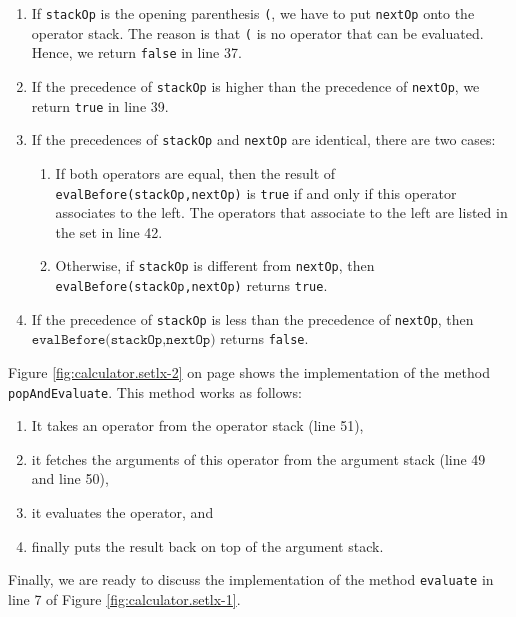 \begin{enumerate}
\item If \texttt{stackOp} is the opening parenthesis \texttt{(}, we have to put
      \texttt{nextOp} onto the operator stack.  The reason is that \texttt{(}
      is no operator that can be evaluated.  Hence, we return \texttt{false} in line 37.
\item If the precedence of \texttt{stackOp} is higher than the precedence of \texttt{nextOp}, we
      return \texttt{true} in line 39.
\item If the precedences of \texttt{stackOp} and \texttt{nextOp} are identical, there are two cases:
      \begin{enumerate}
      \item If both operators are equal, then the result of
            \texttt{evalBefore(stackOp,nextOp)} is \texttt{true} if and only if
            this operator associates to the left.  The operators that associate to the left are
            listed in the set in line 42.
      \item Otherwise, if \texttt{stackOp} is different from \texttt{nextOp}, then \\
            \texttt{evalBefore(stackOp,nextOp)} returns \texttt{true}. 
      \end{enumerate}
\item If the precedence of \texttt{stackOp} is less than the precedence of \texttt{nextOp}, then 
      $\texttt{evalBefore(stackOp,nextOp})$ returns \texttt{false}.
\end{enumerate}
Figure  \ref{fig:calculator.setlx-2} on page \pageref{fig:calculator.setlx-2} shows the
implementation of the method \texttt{popAndEvaluate}.
This method works as follows: 
\begin{enumerate}
\item It takes an operator from the operator stack (line 51), 
\item it fetches the arguments of this operator from the argument stack (line 49 and line 50),
\item it evaluates the operator,  and
\item finally puts the result back on top of the argument stack.
\end{enumerate}
Finally, we are ready to discuss the implementation of the method \texttt{evaluate} in line 7 of
Figure \ref{fig:calculator.setlx-1}.  

